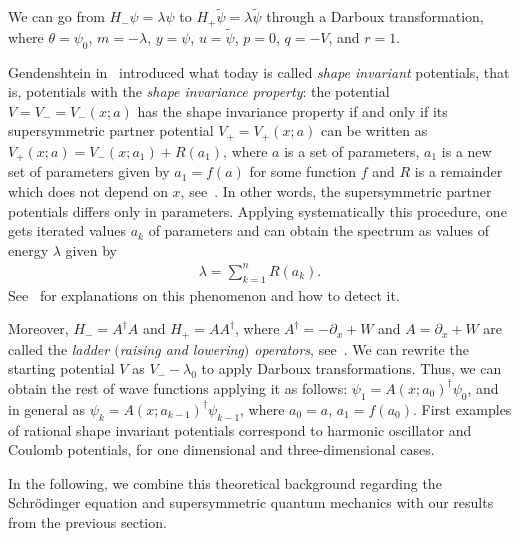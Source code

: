\documentclass[pdftex]{sigma}%
\numberwithin{equation}{section}
\begin{document}
We can go from $H_-\psi=\lambda\psi$ to $H_+\widetilde{\psi}=\lambda\widetilde{\psi}$ through a Darboux transformation, where $\theta=\psi_0$, $m=-\lambda$, $y=\psi$, $u=\widetilde{\psi}$, $p=0$, $q=-V$, and $r=1$.

Gendenshtein in~\cite{ge} introduced what today is called \emph{shape invariant} potentials, that is, potentials with the \emph{shape invariance property}: the potential $V=V_-=V_-(x;a)$ has the shape invariance property if and only if its supersymmetric partner potential $V_+=V_+(x;a)$ can be written as $V_+(x;a)=V_-(x;a_1)+R(a_1)$, where $a$ is a set of
parameters, $a_1$ is a new set of parameters given by $a_1=f(a)$ for some function $f$ and $R$ is a remainder which does not depend on $x$, see~\cite[Introduction and Section~4.3]{AP1}.
In other words, the supersymmetric partner potentials differs only in parameters. Applying systematically this procedure, one gets
iterated values $a_k$ of parameters and can obtain
the spectrum as values of energy $\lambda$ given by
\begin{gather*}
\lambda=\sum_{k=1}^n R(a_k).
\end{gather*}
See~\cite[Section~4.3]{AP1} for explanations on this phenomenon and how to detect it.


 Moreover, $H_-=A^\dag A$ and $H_+=A A^\dag$, where $A^\dag=-\partial_x+W$ and $A=\partial_x+W$ are called the \emph{ladder $($raising and lowering$)$ operators}, see~\cite{DKS}. We can rewrite the starting potential $V$ as ${V_--\lambda_0}$ to apply Darboux transformations. Thus, we can obtain the rest of wave functions applying it as follows: $\psi_1=A(x;a_0)^\dag\psi_0$, and in general as $\psi_k=A(x;a_{k-1})^\dag\psi_{k-1}$, where ${a_0=a}$, $a_1=f(a_0)$.
First examples of rational shape invariant potentials correspond to harmonic oscillator and Coulomb potentials, for one dimensional and three-dimensional cases.

In the following, we combine this theoretical background regarding the Schr\"odinger equation and supersymmetric quantum mechanics with our results from the previous section.
\end{document}
